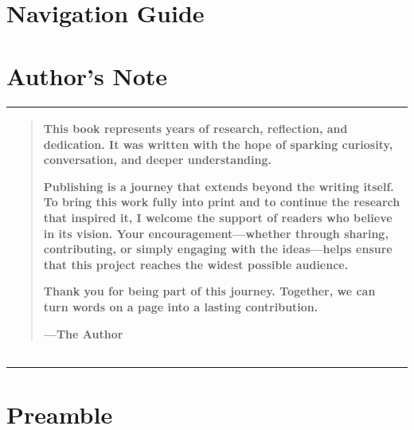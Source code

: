 \documentclass[a4paper]{article}
\begin{document}
\section{Navigation Guide}
\label{SECTOC}

\tableofcontents



\newpage


\section{Author's Note}
\label{SECAUTHNOTE}




\begin{table}[H]
  \centering
  \LARGE
	\begin{tabular}[t]{|p{}}
\noindent
\begin{minipage}{1\textwidth}
\vspace{1em}
\begin{quotation}
{\ttfamily

This book represents years of research, reflection, and dedication. It was written with the hope of sparking curiosity, conversation, and deeper understanding.

Publishing is a journey that extends beyond the writing itself. To bring this work fully into print and to continue the research that inspired it, I welcome the support of readers who believe in its vision. Your encouragement---whether through sharing, contributing, or simply engaging with the ideas---helps ensure that this project reaches the widest possible audience.

Thank you for being part of this journey. Together, we can turn words on a page into a lasting contribution.

}
\hspace*{\fill} ---\textbf{The Author}
\end{quotation}
\vspace{1em}
\end{minipage}
\\
	\hline
	              
\end{tabular}
  \label{TABDEDC}
\end{table}



\newpage

\noindent\rule{\textwidth}{0.4pt}



\section{Preamble}
\label{SECINTRO}
\end{document}
